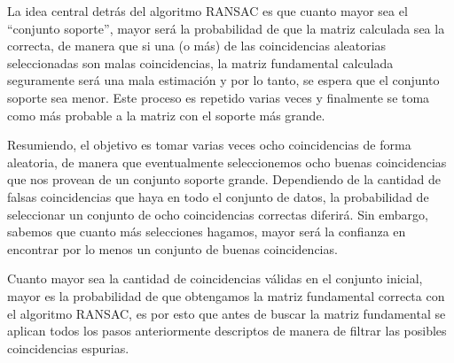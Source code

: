 \documentclass[a4paper,11pt,spanish]{article}
\begin{document}
La idea central detrás del algoritmo RANSAC es que cuanto mayor sea el ``conjunto soporte'', mayor será la probabilidad de que la matriz calculada sea la correcta, de manera que si una (o más) de las coincidencias aleatorias seleccionadas son malas coincidencias, la matriz fundamental calculada seguramente será una mala estimación y por lo tanto, se espera que el conjunto soporte sea menor. Este proceso es repetido varias veces y finalmente se toma como más probable a la matriz con el soporte más grande.

Resumiendo, el objetivo es tomar varias veces ocho coincidencias de forma aleatoria, de manera que eventualmente seleccionemos ocho buenas coincidencias que nos provean de un conjunto soporte grande. Dependiendo de la cantidad de falsas coincidencias que haya en todo el conjunto de datos, la probabilidad de seleccionar un conjunto de ocho coincidencias correctas diferirá. Sin embargo, sabemos que cuanto más selecciones hagamos, mayor será la confianza en encontrar por lo menos un conjunto de buenas coincidencias.



Cuanto mayor sea la cantidad de coincidencias válidas en el conjunto inicial, mayor es la probabilidad de que obtengamos la matriz fundamental correcta con el algoritmo RANSAC, es por esto que antes de buscar la matriz fundamental se aplican todos los pasos anteriormente descriptos de manera de filtrar las posibles coincidencias espurias.
\end{document}
